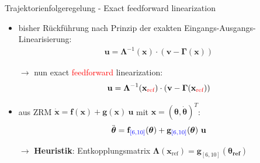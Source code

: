 \documentclass[
	ngerman,
	10pt,				%
	aspectratio=169, 	%
	xcolor=dvipsnames
]{beamer}
\begin{document}

\begin{frame}[t,fragile,label=trajektorienregelung_9]{\large Trajektorienfolgeregelung - Exact feedforward linearization}
	
	\begin{itemize}
		\item bisher Rückführung nach Prinzip der exakten Eingangs-Ausgangs-Linearisierung:
		\begin{align*}
			\mathbf{u} = \boldsymbol{\Lambda }^{-1}(\mathbf{x}) \cdot (\mathbf{v} - \boldsymbol{\Gamma}(\mathbf{x}))
		\end{align*}
		\item[$\rightarrow$] nun exact \textcolor{red}{feedforward} linearization:
		\begin{align*}
			\mathbf{u} = \boldsymbol{\Lambda}^{-1}(\mathbf{x}_{\textcolor{red}{\text{ref}}}) \cdot (\mathbf{v} - \boldsymbol{\Gamma}(\mathbf{x}_{\textcolor{red}{\text{ref}}}))
		\end{align*}
		\pause
		\item aus ZRM $\dot{\mathbf{x}} = \mathbf{f}(\mathbf{x}) + \mathbf{g}(\mathbf{x}) \ \mathbf{u}$ mit $\mathbf{x} = (\boldsymbol{\theta}, \dot{\boldsymbol{\theta}})^T$:
		\begin{align*}
			\ddot{\boldsymbol{\theta}} = \mathbf{f}_{\textcolor{blue}{[6, 10]}}(\boldsymbol{\theta}) + \mathbf{g}_{\textcolor{blue}{[6, 10]}}(\boldsymbol{\theta}) \ \mathbf{u}
		\end{align*}
		\pause
		\item[$\rightarrow$] \textbf{Heuristik}: Entkopplungsmatrix $\boldsymbol{\Lambda}(\mathbf{x}_{\text{ref}}) = \mathbf{g}_{[6, 10]}(\boldsymbol{\theta_{\text{ref}}})$
	\end{itemize}
	

\end{frame}
\end{document}

